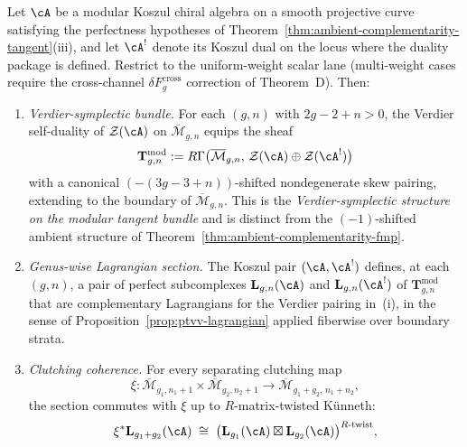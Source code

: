 \begin{theorem}
\label{thm:lagrangian-complementarity-global-upgrade}
\label{V1-thm:lagrangian-complementarity-global-upgrade}%
%
%
Let $\cA$ be a modular Koszul chiral algebra on a smooth projective
curve satisfying the perfectness hypotheses of
Theorem~\textup{\ref{thm:ambient-complementarity-tangent}(iii)}, and let
$\cA^!$ denote its Koszul dual on the locus where the duality package
is defined. Restrict to the uniform-weight scalar lane
(multi-weight cases require the cross-channel $\delta F_g^{\mathrm{cross}}$
correction of Theorem~D). Then:
\begin{enumerate}[label=\textup{(\roman*)}]
\item \emph{Verdier-symplectic bundle.}
For each $(g,n)$ with $2g-2+n>0$, the Verdier self-duality of
$\mathcal{Z}(\cA)$ on $\overline{\mathcal{M}}_{g,n}$ equips the sheaf
\[
 \mathbf{T}^{\mathrm{mod}}_{g,n}
 := R\Gamma\bigl(\overline{\mathcal{M}}_{g,n},\, \mathcal{Z}(\cA) \oplus
 \mathcal{Z}(\cA^!)\bigr)
\]
with a canonical $(-(3g-3+n))$-shifted nondegenerate skew pairing,
extending \textup{\cite[Example~1.4]{PTVV13}} to the boundary of
$\overline{\mathcal{M}}_{g,n}$. This is the \emph{Verdier-symplectic
structure on the modular tangent bundle} and is distinct from the
$(-1)$-shifted ambient structure of
Theorem~\textup{\ref{thm:ambient-complementarity-fmp}}.
\item \emph{Genus-wise Lagrangian section.}
The Koszul pair $(\cA,\cA^!)$ defines, at each $(g,n)$, a pair of
perfect subcomplexes $\mathbf{L}_{g,n}(\cA)$ and
$\mathbf{L}_{g,n}(\cA^!)$ of
$\mathbf{T}^{\mathrm{mod}}_{g,n}$ that are complementary Lagrangians
for the Verdier pairing in~\textup{(i)}, in the sense of
Proposition~\textup{\ref{prop:ptvv-lagrangian}} applied fiberwise
over boundary strata.
\item \emph{Clutching coherence.}
For every separating clutching map
\[
 \xi: \overline{\mathcal{M}}_{g_1,n_1+1} \times
 \overline{\mathcal{M}}_{g_2,n_2+1}
 \longrightarrow \overline{\mathcal{M}}_{g_1+g_2,\, n_1+n_2},
\]
the section commutes with $\xi$ up to $R$-matrix-twisted K\"unneth:
\[
 \xi^*\mathbf{L}_{g_1+g_2}(\cA)
 \;\cong\; \bigl(\mathbf{L}_{g_1}(\cA) \boxtimes \mathbf{L}_{g_2}(\cA)\bigr)^{R\text{-twist}},
\]
\end{enumerate}
\end{theorem}
